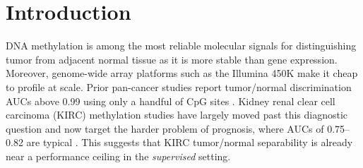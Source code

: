 \documentclass[sigconf]{acmart}
\begin{document}



\maketitle

\section{Introduction}
\label{sec:intro}

DNA methylation is among the most reliable molecular signals for distinguishing tumor from adjacent normal tissue as it is more stable than gene expression. Moreover, genome-wide array platforms such as the Illumina 450K make it cheap to profile at scale. Prior pan-cancer studies report tumor/normal discrimination AUCs above 0.99 using only a handful of CpG sites \cite{ding2019integrative, liu2019dna}. Kidney renal clear cell carcinoma (KIRC) methylation studies have largely moved past this diagnostic question and now target the harder problem of prognosis, where AUCs of 0.75--0.82 are typical \cite{tang2020novel}. This suggests that KIRC tumor/normal separability is already near a performance ceiling in the \emph{supervised} setting.
\end{document}
